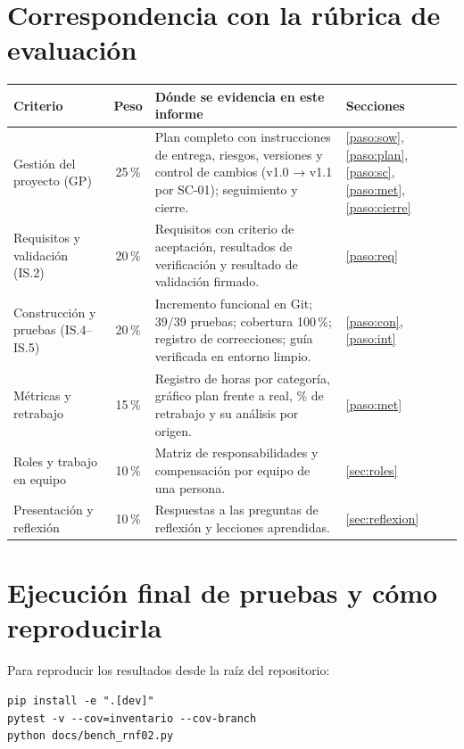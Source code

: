 \documentclass[11pt,a4paper]{article}
\begin{document}
\section{Correspondencia con la rúbrica de evaluación}
\begin{table}[H]
\centering\small
\begin{tabularx}{\linewidth}{@{}P{3.6cm} c L l@{}}
\toprule
\textbf{Criterio} & \textbf{Peso} & \textbf{Dónde se evidencia en este informe} & \textbf{Secciones} \\
\midrule
Gestión del proyecto (GP) & 25\,\% & Plan completo con instrucciones de entrega, riesgos, versiones y control de cambios (v1.0 → v1.1 por SC-01); seguimiento y cierre. & \ref{paso:sow}, \ref{paso:plan}, \ref{paso:sc}, \ref{paso:met}, \ref{paso:cierre} \\
Requisitos y validación (IS.2) & 20\,\% & Requisitos con criterio de aceptación, resultados de verificación y resultado de validación firmado. & \ref{paso:req} \\
Construcción y pruebas (IS.4–IS.5) & 20\,\% & Incremento funcional en Git; 39/39 pruebas; cobertura 100\,\%; registro de correcciones; guía verificada en entorno limpio. & \ref{paso:con}, \ref{paso:int} \\
Métricas y retrabajo & 15\,\% & Registro de horas por categoría, gráfico plan frente a real, \% de retrabajo y su análisis por origen. & \ref{paso:met} \\
Roles y trabajo en equipo & 10\,\% & Matriz de responsabilidades y compensación por equipo de una persona. & \ref{sec:roles} \\
Presentación y reflexión & 10\,\% & Respuestas a las preguntas de reflexión y lecciones aprendidas. & \ref{sec:reflexion} \\
\bottomrule
\end{tabularx}
\end{table}

\clearpage
\section{Ejecución final de pruebas y cómo reproducirla}
\noindent Para reproducir los resultados desde la raíz del repositorio:
\begin{lstlisting}[style=consola]
pip install -e ".[dev]"
pytest -v --cov=inventario --cov-branch
python docs/bench_rnf02.py
\end{lstlisting}
\end{document}
